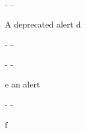 \medbreak
\label{module-Alerts-val-d}\begin{ocamlindent}\begin{description}\kern-\topsep
\makeatletter\advance\@topsepadd-\topsep\makeatother%
\item[{deprecated}]{A deprecated alert d}\end{description}%
\end{ocamlindent}%
\medbreak
\label{module-Alerts-val-d2}\begin{ocamlindent}\begin{description}\kern-\topsep
\makeatletter\advance\@topsepadd-\topsep\makeatother%
\item[{deprecated}]{}\end{description}%
\end{ocamlindent}%
\medbreak
\label{module-Alerts-val-e}\begin{ocamlindent}\begin{description}\kern-\topsep
\makeatletter\advance\@topsepadd-\topsep\makeatother%
\item[{alert}]{e an alert}\end{description}%
\end{ocamlindent}%
\medbreak
\label{module-Alerts-val-f}\begin{ocamlindent}\begin{description}\kern-\topsep
\makeatletter\advance\@topsepadd-\topsep\makeatother%
\item[{alert}]{f}\end{description}%
\end{ocamlindent}%
\medbreak


